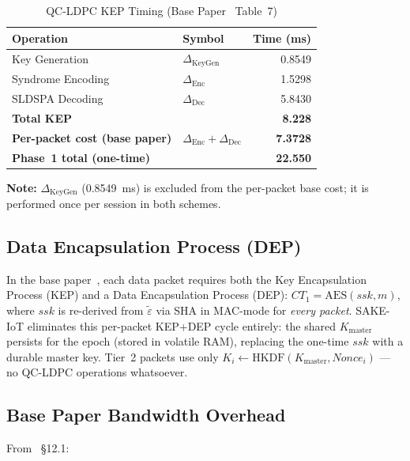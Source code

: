 \documentclass[conference]{IEEEtran}
\newcommand{\Kmaster}{K_{\mathrm{master}}}
\begin{document}
\begin{table}[!t]
\centering
\caption{QC-LDPC KEP Timing (Base Paper~\cite{kumari2022} Table~7)}
\label{tab:qcldpc}
\begin{tabular}{llr}
\toprule
\textbf{Operation} & \textbf{Symbol} & \textbf{Time (ms)} \\
\midrule
Key Generation & $\Delta_{\mathrm{KeyGen}}$ & 0.8549 \\
Syndrome Encoding & $\Delta_{\mathrm{Enc}}$ & 1.5298 \\
SLDSPA Decoding & $\Delta_{\mathrm{Dec}}$ & 5.8430 \\
\midrule
\textbf{Total KEP} & & \textbf{8.228} \\
\midrule
\textbf{Per-packet cost (base paper)} & $\Delta_{\mathrm{Enc}}+\Delta_{\mathrm{Dec}}$ & \textbf{7.3728} \\
\textbf{Phase~1 total (one-time)} & & \textbf{22.550} \\
\bottomrule
\end{tabular}
\end{table}

\noindent\textbf{Note:} $\Delta_{\mathrm{KeyGen}}$ (0.8549~ms) is
excluded from the per-packet base cost; it is performed once per
session in both schemes.

\subsection{Data Encapsulation Process (DEP)}

In the base paper~\cite{kumari2022}, each data packet requires both the Key
Encapsulation Process (KEP) and a Data Encapsulation Process (DEP):
$CT_1 = \mathrm{AES}(\mathit{ssk}, m)$, where $\mathit{ssk}$ is re-derived
from $\tilde{\varepsilon}$ via SHA in MAC-mode for \emph{every packet}.
SAKE-IoT eliminates this per-packet KEP+DEP cycle entirely: the shared $\Kmaster$
persists for the epoch (stored in volatile RAM), replacing the one-time $\mathit{ssk}$
with a durable master key. Tier~2 packets use only $K_i \leftarrow
\mathrm{HKDF}(\Kmaster, \mathit{Nonce}_i)$ --- no QC-LDPC operations whatsoever.

\subsection{Base Paper Bandwidth Overhead}

From~\cite{kumari2022} \S12.1:
\end{document}
